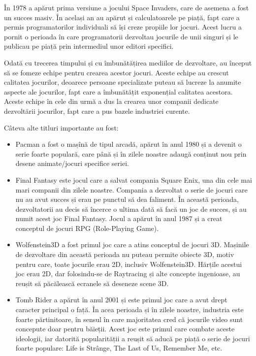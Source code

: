 \documentclass[12pt, a4paper]{article}
\begin{document}
	În 1978 a apărut prima versiune a jocului Space Invaders, care de asemena a fost un succes masiv. În același an au apărut și calculatoarele pe piață, fapt care a permis programatorilor individuali să își creze propiile lor jocuri. Acest lucru a pornit o perioada în care programatorii dezvoltau jocurile de unii singuri și le publicau pe piață prin intermediul unor editori specifici.
	\newline
	
	Odată cu trecerea timpului și cu îmbunătățirea mediilor de dezvoltare, au început să se fomeze echipe pentru crearea acestor jocuri. Aceste echipe au crescut calitatea jocurilor, deoarece persoane specializate puteau să lucreze la anumite aspecte ale jocurilor, fapt care a îmbunătățit exponențial calitatea acestora. Aceste echipe în cele din urmă a dus la crearea unor companii dedicate dezvoltării jocurilor, fapt care a pus bazele industriei curente.
	
	Câteva alte titluri importante au fost:
	
	\begin{itemize}
		\item Pacman a fost o mașînă de tipul arcadă, apărut în anul 1980 și a devenit o serie foarte populară, care până și în zilele noastre adaugă conținut nou prin desene animate/jocuri specifice seriei.
		\item Final Fantasy este jocul care a salvat compania Square Enix, una din cele mai mari companii din zilele noastre. Compania a dezvoltat o serie de jocuri care nu au avut succes și erau pe punctul să dea faliment. În această perioada, dezvoltatorii au decis să încerce o ultima dată să facă un joc de succes, și au numit acest joc Final Fantasy. Jocul a apărut în anul 1987 și a creat conceptul de jocuri RPG (Role-Playing Game).
		\item Wolfenstein3D a fost primul joc care a atins conceptul de jocuri 3D. Mașinile de dezvoltare din această perioada nu puteau permite obiecte 3D, motiv pentru care, toate jocurile erau 2D, inclusiv Wolfenstein3D. Hărțile acestui joc erau 2D, dar folosindu-se de Raytracing și alte concepte ingenioase, au reușit să păcălească ecranele să deseneze scene 3D.
		\item Tomb Rider a apărut în anul 2001 și este primul joc care a avut drept caracter principal o față. În acea perioada și în zilele noastre, industria este foarte părtinitoare, în sensul în care majoritatea cred că jocurile video sunt concepute doar pentru băieții. Acest joc este primul care combate aceste ideologii, iar datorită popularității a reușit să aducă pe piață o serie de jocuri foarte populare: Life is Strânge, The Last of Us, Remember Me, etc.
	\end{itemize}	
\end{document}
